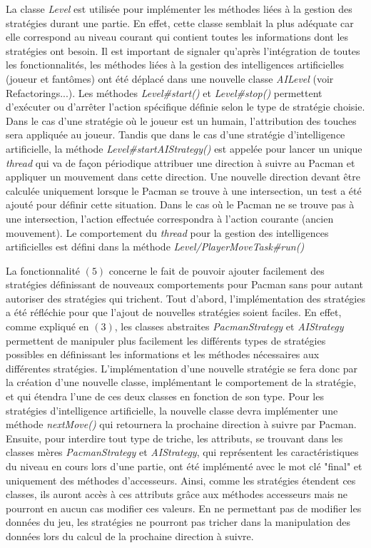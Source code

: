 \documentclass[12pt, openany]{report}
\begin{document}
La classe \mbox{\textit{Level}} est utilisée pour implémenter les méthodes liées à la gestion des stratégies durant une partie. En effet, cette classe semblait la plus adéquate car elle correspond au niveau courant qui contient toutes les informations dont les stratégies ont besoin. Il est important de signaler qu'après l'intégration de toutes les fonctionnalités, les méthodes liées à la gestion des intelligences artificielles (joueur et fantômes) ont été déplacé dans une nouvelle classe \mbox{\textit{AILevel}} (voir Refactorings...). Les méthodes \mbox{\textit{Level\#start()}} et \mbox{\textit{Level\#stop()}} permettent d'exécuter ou d'arrêter l'action spécifique définie selon le type de stratégie choisie. Dans le cas d'une stratégie où le joueur est un humain, l'attribution des touches sera appliquée au joueur. Tandis que dans le cas d'une stratégie d'intelligence artificielle, la méthode \mbox{\textit{Level\#startAIStrategy()}} est appelée pour lancer un unique \textit{thread} qui va de façon périodique attribuer une direction à suivre au Pacman et appliquer un mouvement dans cette direction. Une nouvelle direction devant être calculée uniquement lorsque le Pacman se trouve à une intersection, un test a été ajouté pour définir cette situation. Dans le cas où le Pacman ne se trouve pas à une intersection, l'action effectuée correspondra à l'action courante (ancien mouvement). Le comportement du \textit{thread} pour la gestion des intelligences artificielles est défini dans la méthode \mbox{\textit{Level/PlayerMoveTask\#run()}}


La fonctionnalité $(5)$ concerne le fait de pouvoir ajouter facilement des stratégies définissant de nouveaux comportements pour Pacman sans pour autant autoriser des stratégies qui trichent. Tout d'abord, l'implémentation des stratégies a été réfléchie pour que l'ajout de nouvelles stratégies soient faciles. En effet, comme expliqué en $(3)$, les classes abstraites \mbox{\textit{PacmanStrategy}} et \mbox{\textit{AIStrategy}} permettent de manipuler plus facilement les différents types de stratégies possibles en définissant les informations et les méthodes nécessaires aux différentes stratégies. L'implémentation d'une nouvelle stratégie se fera donc par la création d'une nouvelle classe, implémentant le comportement de la stratégie, et qui étendra l'une de ces deux classes en fonction de son type. Pour les stratégies d'intelligence artificielle, la nouvelle classe devra implémenter une méthode \mbox{\textit{nextMove()}} qui retournera la prochaine direction à suivre par Pacman. Ensuite, pour interdire tout type de triche, les attributs, se trouvant dans les classes mères \mbox{\textit{PacmanStrategy}} et \mbox{\textit{AIStrategy}}, qui représentent les caractéristiques du niveau en cours lors d'une partie, ont été implémenté avec le mot clé "final" et uniquement des méthodes d'accesseurs. Ainsi, comme les stratégies étendent ces classes, ils auront accès à ces attributs grâce aux méthodes accesseurs mais ne pourront en aucun cas modifier ces valeurs. En ne permettant pas de modifier les données du jeu, les stratégies ne pourront pas tricher dans la manipulation des données lors du calcul de la prochaine direction à suivre.
\end{document}
